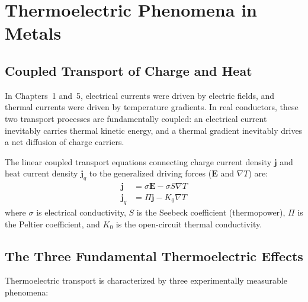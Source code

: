 \documentclass[11pt,a4paper]{article}
\newcommand{\vb}[1]{\mathbf{#1}}
\begin{document}
\clearpage


\section{Thermoelectric Phenomena in Metals}
\label{sec:thermoelectricity}

\subsection{Coupled Transport of Charge and Heat}
In Chapters~1 and~5, electrical currents were driven by electric fields, and thermal currents were driven by temperature gradients. In real conductors, these two transport processes are fundamentally coupled: an electrical current inevitably carries thermal kinetic energy, and a thermal gradient inevitably drives a net diffusion of charge carriers.

The linear coupled transport equations connecting charge current density $\vb{j}$ and heat current density $\vb{j}_q$ to the generalized driving forces ($\vb{E}$ and $\nabla T$) are:
\begin{align}
\vb{j} &= \sigma \vb{E} - \sigma S \nabla T \label{eq:coupled_charge} \\
\vb{j}_q &= \Pi \vb{j} - K_0 \nabla T \label{eq:coupled_heat}
\end{align}
where $\sigma$ is electrical conductivity, $S$ is the Seebeck coefficient (thermopower), $\Pi$ is the Peltier coefficient, and $K_0$ is the open-circuit thermal conductivity.

\subsection{The Three Fundamental Thermoelectric Effects}
Thermoelectric transport is characterized by three experimentally measurable phenomena:
\end{document}
